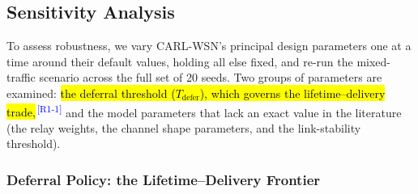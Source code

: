 \documentclass[12pt]{article}
\newcommand{\rtag}[1]{\textsuperscript{\textcolor{blue}{\scriptsize\,[#1]}}}
\newcommand{\hlx}[1]{{\exhyphenpenalty=10000\hyphenpenalty=10000\let\ \nobreakspace\hl{#1}}}
\begin{document}
\begin{table}[!t]
\renewcommand{\arraystretch}{1.2}
\caption{CARL-WSN versus RL Baselines --- Mixed Traffic (CARL-WSN value vs.\ baseline value)}
\label{tab:rl_compare}
\centering
{}
\end{table}

\subsection{Sensitivity Analysis}
\label{sec:sensitivity}

To assess robustness, we vary CARL-WSN's principal design parameters
one at a time around their default values, holding all else fixed,
and re-run the mixed-traffic scenario across the full set of 20
seeds. Two groups of parameters are examined: \hlx{the deferral threshold
($T_{\mathrm{defer}}$), which governs the lifetime--delivery trade,}\rtag{R1-1}
and the model parameters that lack an exact value in the literature
(the relay weights, the channel shape parameters, and the
link-stability threshold).

\subsubsection{Deferral Policy: the Lifetime--Delivery Frontier}
\end{document}
